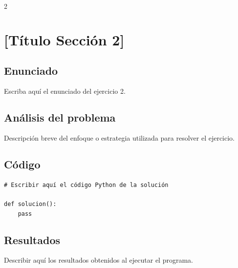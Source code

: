 2

\section{[Título Sección 2]}

\subsection*{Enunciado}

\begin{tcolorbox}[colback=gray!8, colframe=gray!50, title=Ejercicio 2]
    Escriba aquí el enunciado del ejercicio 2.
\end{tcolorbox}

\subsection{Análisis del problema}

Descripción breve del enfoque o estrategia utilizada para resolver el ejercicio.

\subsection{Código}

\begin{lstlisting}[caption={Solución ejercicio 2}, label={lst:ej2}]
# Escribir aquí el código Python de la solución

def solucion():
    pass
\end{lstlisting}

\subsection{Resultados}

\begin{respuesta}
    Describir aquí los resultados obtenidos al ejecutar el programa.
\end{respuesta}


\newpage
